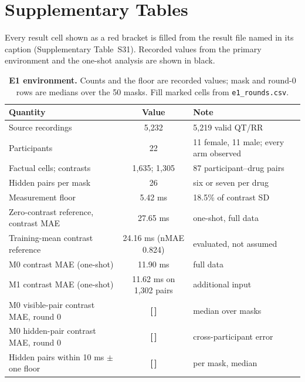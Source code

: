 \documentclass[11pt,a4paper]{article}
\newcommand{\T}{{\color{red}\textbf{[\,]}}}
\begin{document}
\section*{Supplementary Tables}
Every result cell shown as a red bracket is filled from the result file named in its caption (Supplementary Table~S31). Recorded values from the primary environment and the one-shot analysis are shown in black.
\clearpage
\begin{table}[!htbp]\centering\footnotesize
\caption{\textbf{E1 environment.} Counts and the floor are recorded values; mask and round-0 rows are medians over the 50 masks. Fill marked cells from \texttt{e1\_rounds.csv}.}
\begin{tabularx}{\textwidth}{@{}Y c Y@{}}\toprule
Quantity & Value & Note\\\midrule
Source recordings & 5,232 & 5,219 valid QT/RR\\
Participants & 22 & 11 female, 11 male; every arm observed\\
Factual cells; contrasts & 1,635; 1,305 & 87 participant--drug pairs\\
Hidden pairs per mask & 26 & six or seven per drug\\
Measurement floor & 5.42 ms & 18.5\% of contrast SD\\
Zero-contrast reference, contrast MAE & 27.65 ms & one-shot, full data\\
Training-mean contrast reference & 24.16 ms (nMAE 0.824) & evaluated, not assumed\\
M0 contrast MAE (one-shot) & 11.90 ms & full data\\
M1 contrast MAE (one-shot) & 11.62 ms on 1,302 pairs & additional input\\
M0 visible-pair contrast MAE, round 0 & \T & median over masks\\
M0 hidden-pair contrast MAE, round 0 & \T & cross-participant error\\
Hidden pairs within 10 ms $\pm$ one floor & \T & per mask, median\\
\bottomrule\end{tabularx}
\end{table}
\FloatBarrier
\end{document}
